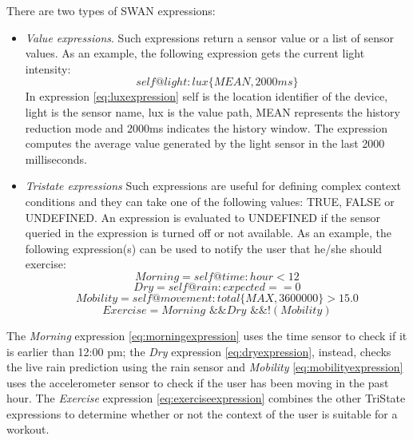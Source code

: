 There are two types of SWAN expressions:
\begin{itemize}
\item \emph{Value expressions}. Such expressions return a sensor value or a list of sensor
values. As an example, the following expression gets the current light intensity:
\begin{equation} \label{eq:luxexpression}
self@light:lux\big\{MEAN, 2000ms\big\}
\end{equation}
In expression \ref{eq:luxexpression} self is the location identifier of the device, light
is the sensor name, lux is the value path, MEAN represents the history reduction mode and 2000ms indicates the history window. The expression computes the average value generated by the light sensor in the last 2000 milliseconds.

\item \emph{Tristate expressions} Such expressions are useful for defining complex context conditions and they can take one of the following values: TRUE, FALSE or UNDEFINED. An expression is evaluated to UNDEFINED if the sensor queried in the expression is turned off or not available. As an example, the following expression(s) can be used to notify the user that he/she should exercise:
\begin{equation} \label{eq:morningexpression}
Morning = self@time:hour < 12 
\end{equation}
\begin{equation} \label{eq:dryexpression}
Dry = self@rain:expected == 0 
\end{equation}
\begin{equation} \label{eq:mobilityexpression}
Mobility = self@movement:total \big\{MAX,3600000\big\} > 15.0
\end{equation}
\begin{equation} \label{eq:exerciseexpression}
Exercise = Morning \text{ \&\& } Dry \text{ \&\& }  \text{!} (Mobility)
\end{equation}
\end{itemize}
The \emph{Morning} expression \ref{eq:morningexpression} uses the time sensor to
check if it is earlier than 12:00 pm; the \emph{Dry} expression \ref{eq:dryexpression}, instead, checks the live rain prediction using the rain sensor and \emph{Mobility} \ref{eq:mobilityexpression} uses the accelerometer sensor to check if the user has been moving in the past hour. The \emph{Exercise} expression \ref{eq:exerciseexpression} combines the other TriState expressions to determine whether or not the context of the user is suitable for a workout.

